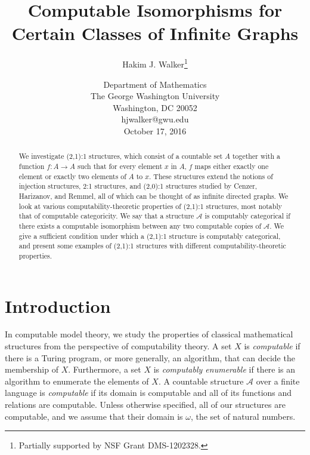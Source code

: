 \documentclass[12pt]{article}
\begin{document}
\title{\textbf{Computable Isomorphisms for Certain Classes of Infinite Graphs}}
\author{Hakim J. Walker\thanks{Partially supported by NSF Grant DMS-1202328.}}
\date{\small Department of Mathematics\\
\small The George Washington University\\
\small Washington, DC 20052\\
\small hjwalker@gwu.edu\\
October 17, 2016}

\maketitle

\begin{abstract}
We investigate (2,1):1 structures, which consist of a countable set $A$ together with a function $f: A \to A$ such that for every element $x$ in $A$, $f$ maps either exactly one element or exactly two elements of $A$ to $x$. These structures extend the notions of injection structures, 2:1 structures, and (2,0):1 structures studied by Cenzer, Harizanov, and Remmel, all of which can be thought of as infinite directed graphs. We look at various computability-theoretic properties of (2,1):1 structures, most notably that of computable categoricity. We say that a structure $\mathcal{A}$ is computably categorical if there exists a computable isomorphism between any two computable copies of $\mathcal{A}$. We give a sufficient condition under which a (2,1):1 structure is computably categorical, and present some examples of (2,1):1 structures with different computability-theoretic properties. 
\end{abstract}

\section{Introduction}
In computable model theory, we study the properties of classical mathematical structures from the perspective of computability theory.  A set $X$ is \emph{computable} if there is a Turing program, or more generally, an algorithm, that can decide the membership of $X$. Furthermore, a set $X$ is \emph{computably enumerable} if there is an algorithm to enumerate the elements of $X$. A countable structure $\mathcal{A}$ over a finite language is \emph{computable} if its domain is computable and all of its functions and relations are computable. Unless otherwise specified, all of our structures are computable, and we assume that their domain is $\omega$, the set of natural numbers.
\end{document}
